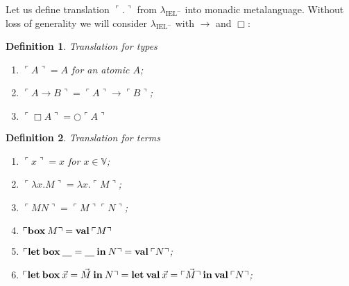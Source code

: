 \documentclass[a4paper]{article}
\newtheorem{defin}{Definition}
\begin{document}
Let us define translation $\ulcorner . \urcorner$ from $\lambda_{\text{IEL}^{-}}$ into monadic metalanguage.
Without loss of generality we will consider $\lambda_{\text{IEL}^{-}}$ with $\to$ and $\Box$:

\begin{defin} Translation for types
  \begin{enumerate}
    \item $\ulcorner A \urcorner = A$ for an atomic $A$;
    \item $\ulcorner A \to B \urcorner = \ulcorner A \urcorner \to \ulcorner B \urcorner$;
    \item $\ulcorner \Box A \urcorner = \bigcirc \ulcorner A \urcorner$
  \end{enumerate}
\end{defin}

\begin{defin} Translation for terms
  \begin{enumerate}
    \item $\ulcorner x \urcorner = x$ for $x \in \mathbb{V}$;
    \item $\ulcorner \lambda x. M \urcorner = \lambda x. \ulcorner M \urcorner$;
    \item $\ulcorner M N \urcorner = \ulcorner M \urcorner \ulcorner N \urcorner$;
    \item $\ulcorner {\bf box \:} M \urcorner = {\bf val \:} \ulcorner M \urcorner$
    \item $\ulcorner {\bf let \: box \:} \underline{\quad} = \underline{\quad} {\: \bf in \:} N \urcorner = {\bf val \:} \ulcorner N \urcorner$;
    \item $\ulcorner {\bf let \: box \:} \vec{x} = \vec{M} {\: \bf in \:} N \urcorner = {\bf let \: val \:} \vec{x} = \ulcorner \vec{M} \urcorner {\: \bf in \:} {\bf val \:} \ulcorner N \urcorner$;
  \end{enumerate}
\end{defin}
\end{document}
